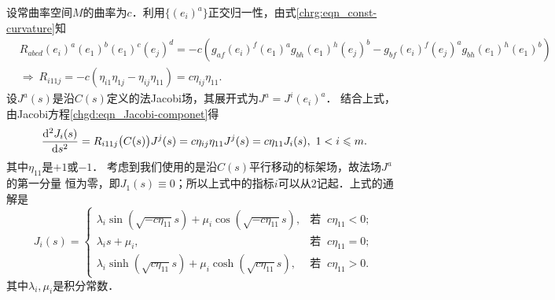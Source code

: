 设常曲率空间$M$的曲率为$c$．利用$\{(e_i)^a\}$正交归一性，由式\eqref{chrg:eqn_const-curvature}知
\setlength{\mathindent}{0em}
\begin{align*}
    &R_{abcd} (e_i)^a (e_1)^b (e_1)^c (e_j)^d  =
      -c(g_{af}(e_i)^f (e_1)^a  g_{bh}(e_1)^h(e_j)^b
        -g_{bf}(e_i)^f (e_j)^a  g_{bh}(e_1)^h(e_1)^b )  \\
    &\Rightarrow\ R_{i11j} = -c (\eta_{i1}\eta_{1j}- \eta_{ij}\eta_{11} )
       = c \eta_{ij}\eta_{11}   .
\end{align*}\setlength{\mathindent}{2em}
设$J^a(s)$是沿$C(s)$定义的法Jacobi场，其展开式为$J^a=J^i (e_i)^a$．
结合上式，由Jacobi方程\eqref{chgd:eqn_Jacobi-componet}得
\begin{equation}
    \frac{{\rm d}^2 J_i(s)}{{\rm d} s^2} =R_{i11j}\bigl(C(s)\bigr) J^j(s)
      = c \eta_{ij}\eta_{11} J^j(s) =c \eta_{11} J_i(s) ,
      \ 1 < i \leqslant m.
\end{equation}
其中$\eta_{11}$是$+1$或$-1$．
考虑到我们使用的是沿$C(s)$平行移动的标架场，故{\kaishu 法场}$J^a$的第一分量
恒为零，即$J_1(s)\equiv 0$；所以上式中的指标$i$可以从$2$记起．上式的通解是
\begin{equation}\label{chgd:eqn_Jacobi-const-curvature}
    J_i(s) = \begin{cases}
        \lambda_i \sin(\sqrt{-c \eta_{11}} s)  + \mu_i \cos(\sqrt{-c \eta_{11}} s ),
            & \text{若 }\ c \eta_{11} <0 ; \\
        \lambda_i s  + \mu_i , & \text{若 }\ c \eta_{11} = 0; \\
        \lambda_i \sinh(\sqrt{ c \eta_{11}} s) + \mu_i \cosh(\sqrt{c \eta_{11}} s) ,
            & \text{若 }\ c \eta_{11}>0 .
    \end{cases}
\end{equation}
其中$\lambda_i, \mu_i$是积分常数．






